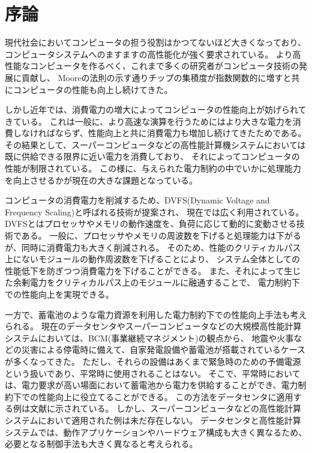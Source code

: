 \chapter{序論}

現代社会においてコンピュータの担う役割はかつてないほど大きくなっており、
コンピュータシステムへのますますの高性能化が強く要求されている。
より高性能なコンピュータを作るべく、これまで多くの研究者がコンピュータ技術の発展に貢献し、
Mooreの法則\cite{mooreslaw}の示す通りチップの集積度が指数関数的に増すと共にコンピュータの性能も向上し続けてきた。



しかし近年では、消費電力の増大によってコンピュータの性能向上が妨げられてきている。
これは一般に、より高速な演算を行うためにはより大きな電力を消費しなければならず、性能向上と共に消費電力も増加し続けてきたためである。
その結果として、スーパーコンピュータなどの高性能計算機システムにおいては既に供給できる限界に近い電力を消費しており、
それによってコンピュータの性能が制限されている。
この様に、与えられた電力制約の中でいかに処理能力を向上させるかが現在の大きな課題となっている。


コンピュータの消費電力を削減するため、DVFS(Dynamic Voltage and Frequency Scaling)と呼ばれる技術が提案され、
現在では広く利用されている。DVFSとはプロセッサやメモリの動作速度を、負荷に応じて動的に変動させる技術である。
一般に、プロセッサやメモリの周波数を下げると処理能力は下がるが、同時に消費電力も大きく削減される。
そのため、性能のクリティカルパス上にないモジュールの動作周波数を下げることにより、
システム全体としての性能低下を防ぎつつ消費電力を下げることができる。
また、それによって生じた余剰電力をクリティカルパス上のモジュールに融通することで、
電力制約下での性能向上を実現できる。



一方で、蓄電池のような電力資源を利用した電力制約下での性能向上手法も考えられる。
現在のデータセンタやスーパーコンピュータなどの大規模高性能計算システムにおいては、BCM(事業継続マネジメント)の観点から、
地震や火事などの災害による停電時に備えて、自家発電設備や蓄電池が搭載されているケースが多くなってきた。
ただし、それらの設備はあくまで緊急時のための予備電源という扱いであり、平常時に使用されることはない。
そこで、平常時においては、電力要求が高い場面において蓄電池から電力を供給することができ、電力制約下での性能向上に役立てることができる。
この方法をデータセンタに適用する例は文献\cite{Govindan:2011:BLT:2024723.2000105}に示されている。
しかし、スーパーコンピュータなどの高性能計算システムにおいて適用された例は未だ存在しない。
データセンタと高性能計算システムでは、動作アプリケーションやハードウェア構成も大きく異なるため、
必要となる制御手法も大きく異なると考えられる。


